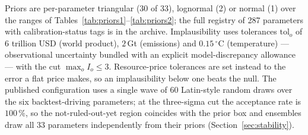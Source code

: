 \documentclass[12pt,a4paper]{article}
\newcommand{\degC}{$^{\circ}$C}
\begin{document}
Priors are per-parameter triangular (30 of 33), lognormal (2) or normal (1) over the ranges of
Tables~\ref{tab:priors1}--\ref{tab:priors2}; the full registry of 287 parameters with
calibration-status tags is in the archive. Implausibility uses tolerances
$\mathrm{tol}_o$ of $6$ trillion USD (world product), $2$\,Gt (emissions) and $0.15$\,\degC{}
(temperature) --- observational uncertainty bundled with an explicit model-discrepancy
allowance --- with the cut $\max_o I_o \le 3$. Resource-price tolerances are set instead to the
error a flat price makes, so an implausibility below one beats the null. The published
configuration uses a single wave of $60$ Latin-style random draws over the six
backtest-driving parameters; at the three-sigma cut the acceptance rate is $100\,\%$, so the
not-ruled-out-yet region coincides with the prior box and ensembles draw all $33$ parameters
independently from their priors (Section~\ref{sec:stability}).
\end{document}
